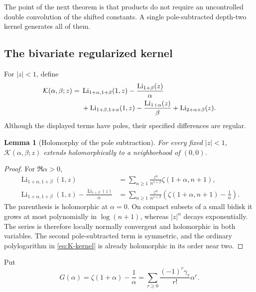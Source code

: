 \documentclass[11pt]{article}
\newtheorem{lemma}[theorem]{Lemma}
\theoremstyle{definition}
\newcommand{\Li}{\operatorname{Li}}
\newcommand{\K}{\mathcal{K}}
\begin{document}
The point of the next theorem is that products do not require an
uncontrolled double convolution of the shifted constants.  A single
pole-subtracted depth-two kernel generates all of them.

\subsection{The bivariate regularized kernel}

For $|z|<1$, define
\begin{align}
 \K(\alpha,\beta;z)={}&
 \Li_{1+\alpha,1+\beta}(1,z)
       -\frac{\Li_{1+\beta}(z)}{\alpha}
 \notag\\
 &+\Li_{1+\beta,1+\alpha}(1,z)
       -\frac{\Li_{1+\alpha}(z)}{\beta}
 +\Li_{2+\alpha+\beta}(z).
 \label{eq:K-kernel}
\end{align}
Although the displayed terms have poles, their specified differences
are regular.

\begin{lemma}[Holomorphy of the pole subtraction]
\label{lem:K-holomorphic}
For every fixed $|z|<1$, $\K(\alpha,\beta;z)$ extends holomorphically
to a neighborhood of $(0,0)$.
\end{lemma}

\begin{proof}
For $\Re\alpha>0$,
\begin{align*}
 \Li_{1+\alpha,1+\beta}(1,z)
 &=\sum_{n\ge1}\frac{z^n}{n^{1+\beta}}
   \zeta(1+\alpha,n+1),\\
 \Li_{1+\alpha,1+\beta}(1,z)
 -\frac{\Li_{1+\beta}(z)}{\alpha}
 &=\sum_{n\ge1}\frac{z^n}{n^{1+\beta}}
 \left(\zeta(1+\alpha,n+1)-\frac1\alpha\right).
\end{align*}
The parenthesis is holomorphic at $\alpha=0$.  On compact subsets of a
small bidisk it grows at most polynomially in $\log(n+1)$, whereas
$|z|^n$ decays exponentially.  The series is therefore locally
normally convergent and holomorphic in both variables.  The second
pole-subtracted term is symmetric, and the ordinary polylogarithm in
\eqref{eq:K-kernel} is already holomorphic in its order near two.
\end{proof}

Put
\begin{equation}
 G(\alpha)=\zeta(1+\alpha)-\frac1\alpha
 =\sum_{r\ge0}\frac{(-1)^r\gamma_r}{r!}\alpha^r.
 \label{eq:G-alpha}
\end{equation}
\end{document}
